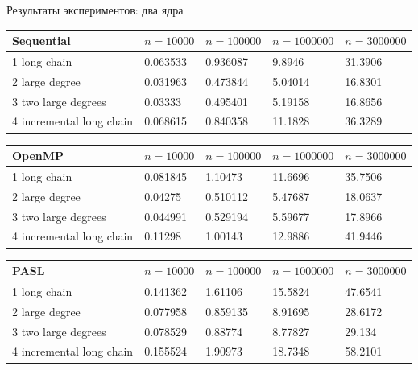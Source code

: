 \documentclass[hyperref=unicode,graphics=pdflatex,13pt]{beamer}
\begin{document}
\begin{frame}[shrink]{Результаты экспериментов: два ядра}

\begin{table}[!ht]
\centering
\begin{tabular}{|l|l|l|l|l|}\hline
Sequential	& $n=10000$ & $n=100000$ & $n=1000000$ & $n=3000000$ \\\hline
1 long chain & 0.063533	& 0.936087 & 9.8946 & 31.3906 \\\hline
2 large degree & 0.031963 & 0.473844 & 5.04014 & 16.8301 \\\hline
3 two large degrees & 0.03333 & 0.495401 & 5.19158 & 16.8656 \\\hline
4 incremental long chain & 0.068615 & 0.840358 & 11.1828 & 36.3289 \\\hline
\end{tabular}
\end{table}

\begin{table}[!ht]
\centering
\begin{tabular}{|l|l|l|l|l|}\hline
OpenMP	& $n=10000$ & $n=100000$ & $n=1000000$ & $n=3000000$ \\\hline
1 long chain & 0.081845 & 1.10473 & 11.6696 & 35.7506 \\\hline
2 large degree & 0.04275 & 0.510112 & 5.47687 & 18.0637 \\\hline
3 two large degrees & 0.044991 & 0.529194 & 5.59677 & 17.8966 \\\hline
4 incremental long chain & 0.11298 & 1.00143 & 12.9886 & 41.9446 \\\hline
\end{tabular}
\end{table}

\begin{table}[!ht]
\centering
\begin{tabular}{|l|l|l|l|l|}\hline

PASL	& $n=10000$ & $n=100000$ & $n=1000000$ & $n=3000000$ \\\hline
1 long chain & 0.141362	& 1.61106 & 15.5824 & 47.6541 \\\hline
2 large degree & 0.077958 & 0.859135 & 8.91695 & 28.6172 \\\hline
3 two large degrees & 0.078529 & 0.88774 & 8.77827 & 29.134 \\\hline
4 incremental long chain & 0.155524 & 1.90973 & 18.7348 & 58.2101 \\\hline
\end{tabular}
\end{table}
\end{frame}
\end{document}
